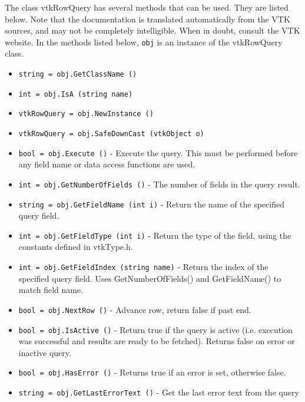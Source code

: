 The class vtkRowQuery has several methods that can be used.
  They are listed below.
Note that the documentation is translated automatically from the VTK sources,
and may not be completely intelligible.  When in doubt, consult the VTK website.
In the methods listed below, \verb|obj| is an instance of the vtkRowQuery class.
\begin{itemize}
\item  \verb|string = obj.GetClassName ()|

\item  \verb|int = obj.IsA (string name)|

\item  \verb|vtkRowQuery = obj.NewInstance ()|

\item  \verb|vtkRowQuery = obj.SafeDownCast (vtkObject o)|

\item  \verb|bool = obj.Execute ()| -  Execute the query.  This must be performed
 before any field name or data access functions
 are used.

\item  \verb|int = obj.GetNumberOfFields ()| -  The number of fields in the query result.

\item  \verb|string = obj.GetFieldName (int i)| -  Return the name of the specified query field.

\item  \verb|int = obj.GetFieldType (int i)| -  Return the type of the field, using the constants defined in vtkType.h.

\item  \verb|int = obj.GetFieldIndex (string name)| -  Return the index of the specified query field.
 Uses GetNumberOfFields() and GetFieldName()
 to match field name.

\item  \verb|bool = obj.NextRow ()| -  Advance row, return false if past end.

\item  \verb|bool = obj.IsActive ()| -  Return true if the query is active (i.e. execution was successful
 and results are ready to be fetched).  Returns false on error or
 inactive query.

\item  \verb|bool = obj.HasError ()| -  Returns true if an error is set, otherwise false.

\item  \verb|string = obj.GetLastErrorText ()| -  Get the last error text from the query


\end{itemize}
